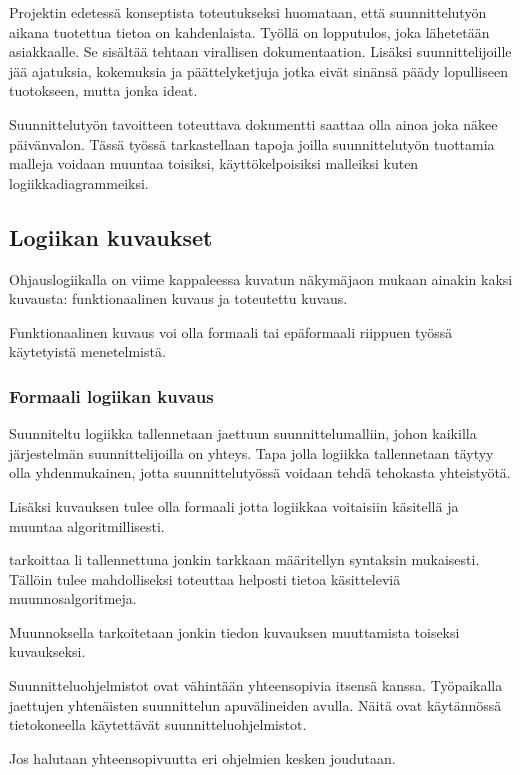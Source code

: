 \documentclass[finnish,12pt]{article}
\begin{document}
Projektin edetessä konseptista toteutukseksi huomataan, että suunnittelutyön aikana tuotettua tietoa on kahdenlaista. Työllä on lopputulos, joka lähetetään asiakkaalle. Se sisältää tehtaan virallisen dokumentaation. Lisäksi suunnittelijoille jää ajatuksia, kokemuksia ja päättelyketjuja jotka eivät sinänsä päädy lopulliseen tuotokseen, mutta jonka ideat. 

Suunnittelutyön tavoitteen toteuttava dokumentti saattaa olla ainoa joka näkee päivänvalon.
Tässä työssä tarkastellaan tapoja joilla suunnittelutyön tuottamia malleja voidaan muuntaa toisiksi, käyttökelpoisiksi malleiksi kuten logiikkadiagrammeiksi.

	\subsection{Logiikan kuvaukset}

	Ohjauslogiikalla on viime kappaleessa kuvatun näkymäjaon mukaan ainakin kaksi kuvausta: funktionaalinen kuvaus ja toteutettu kuvaus.
	
	Funktionaalinen kuvaus voi olla formaali tai epäformaali riippuen työssä käytetyistä menetelmistä. 	
	
		\subsubsection{Formaali logiikan kuvaus}
	
Suunniteltu logiikka tallennetaan jaettuun suunnittelumalliin, johon kaikilla järjestelmän suunnittelijoilla on yhteys.
Tapa jolla logiikka tallennetaan täytyy olla yhdenmukainen, jotta suunnittelutyössä voidaan tehdä tehokasta yhteistyötä.

Lisäksi kuvauksen tulee olla formaali jotta logiikkaa voitaisiin käsitellä ja muuntaa algoritmillisesti.

tarkoittaa li tallennettuna jonkin tarkkaan määritellyn syntaksin mukaisesti.
Tällöin tulee mahdolliseksi toteuttaa helposti tietoa käsitteleviä muunnosalgoritmeja.
 
Muunnoksella tarkoitetaan jonkin tiedon kuvauksen muuttamista toiseksi kuvaukseksi.

Suunnitteluohjelmistot ovat vähintään yhteensopivia itsensä kanssa.
Työpaikalla jaettujen yhtenäisten suunnittelun apuvälineiden avulla.
Näitä ovat käytännössä tietokoneella käytettävät suunnitteluohjelmistot.

Jos halutaan yhteensopivuutta eri ohjelmien kesken joudutaan.
\end{document}
